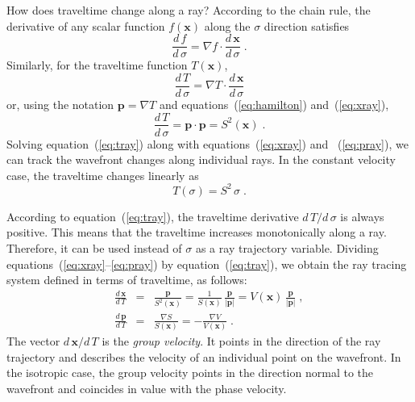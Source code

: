 \documentclass[12pt]{handout}
\begin{document}

How does traveltime change along a ray? According to the chain rule,
the derivative of any scalar function $f(\mathbf{x})$ along the
$\sigma$ direction satisfies
\[
\frac{d\,f}{d\,\sigma} = \nabla f \cdot
\frac{d\,\mathbf{x}}{d\,\sigma}\;.
\]
Similarly, for the traveltime function $T(\mathbf{x})$,
\begin{equation}
  \label{eq:tray0}
  \frac{d\,T}{d\,\sigma} = \nabla T \cdot
  \frac{d\,\mathbf{x}}{d\,\sigma}
\end{equation}
or, using the notation $\mathbf{p} = \nabla T$ and
equations~(\ref{eq:hamilton}) and~(\ref{eq:xray}),
\begin{equation}
  \label{eq:tray}
  \frac{d\,T}{d\,\sigma}
  = \mathbf{p} \cdot \mathbf{p} =
  S^2(\mathbf{x})\;.
\end{equation}
Solving equation~(\ref{eq:tray}) along with equations~(\ref{eq:xray})
and ~(\ref{eq:pray}), we can track the wavefront changes along
individual rays. In the constant velocity case, the traveltime changes
linearly as
\begin{equation}
  \label{eq:tconst}
  T(\sigma) = S^2\,\sigma\;.
\end{equation}

According to equation~(\ref{eq:tray}), the traveltime derivative
$d\,T/d\,\sigma$ is always positive. This means that the traveltime
increases monotonically along a ray. Therefore, it can be used instead
of $\sigma$ as a ray trajectory variable. Dividing
equations~(\ref{eq:xray}--\ref{eq:pray}) by equation~(\ref{eq:tray}),
we obtain the ray tracing system defined in terms of traveltime, as
follows:
\begin{eqnarray}
  \label{eq:xrayt}
  \frac{d\,\mathbf{x}}{d\,T} & = & 
  \frac{\mathbf{p}}{S^2(\mathbf{x})} = 
  \frac{1}{S(\mathbf{x})}\,\frac{\mathbf{p}}{|\mathbf{p}|} =
  V(\mathbf{x})\,\frac{\mathbf{p}}{|\mathbf{p}|}\;, \\
  \label{eq:prayt}
  \frac{d\,\mathbf{p}}{d\,T} & = & \frac{\nabla S}{
    S(\mathbf{x})} = - \frac{\nabla V}{V(\mathbf{x})}\;.
\end{eqnarray}
The vector $d\,\mathbf{x}/d\,T$ is the \emph{group velocity}. It points
  in the direction of the ray trajectory and describes the velocity of
  an individual point on the wavefront. In the isotropic case, the
  group velocity points in the direction normal to the wavefront and
  coincides in value with the phase velocity.
\end{document}
